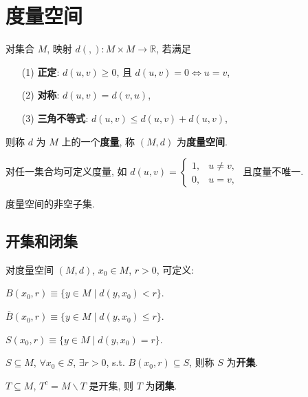 \documentclass{note}
\begin{document}
\fi
\setcounter{chapter}{+11}
\chapter{度量空间}
\begin{df}[度量和度量空间]
    对集合 $M$, 映射 $d(,):M\times M\rightarrow\mathbb{R}$, 若满足
    \begin{itemize}
        \item[(1)] \textbf{正定}: $d(u,v)\geq 0$, 且 $d(u,v)=0\Longleftrightarrow u=v$,
        \item[(2)] \textbf{对称}: $d(u,v)=d(v,u)$,
        \item[(3)] \textbf{三角不等式}: $d(u,v)\leq d(u,v)+d(u,v)$,
    \end{itemize}
    则称 $d$ 为 $M$ 上的一个\textbf{度量}, 称 $(M,d)$ 为\textbf{度量空间}.
\end{df}

对任一集合均可定义度量, 如 $d(u,v)=\left\{\begin{array}{ll}
    1,&u\neq v,\\
    0,&u=v,
\end{array}\right.$ 且度量不唯一.

\begin{df}[子度量空间]
    度量空间的非空子集.
\end{df}

\section{开集和闭集}
对度量空间 $(M,d)$, $x_0\in M$, $r>0$, 可定义:
\begin{df}[开球]
    $B(x_0,r)\equiv\{y\in M\mid d(y,x_0)<r\}$.
\end{df}

\begin{df}[闭球]
    $\bar{B}(x_0,r)\equiv\{y\in M\mid d(y,x_0)\leq r\}$.
\end{df}

\begin{df}[球面]
    $S(x_0,r)\equiv\{y\in M\mid d(y,x_0)=r\}$.
\end{df}

\begin{df}[开集]
    $S\subseteq M$, $\forall x_0\in S$, $\exists r>0$, s.t. $B(x_0,r)\subseteq S$, 则称 $S$ 为\textbf{开集}.
\end{df}

\begin{df}[闭集]
    $T\subseteq M$, $T^c=M\backslash T$ 是开集, 则 $T$ 为\textbf{闭集}.
\end{df}
\end{document}
